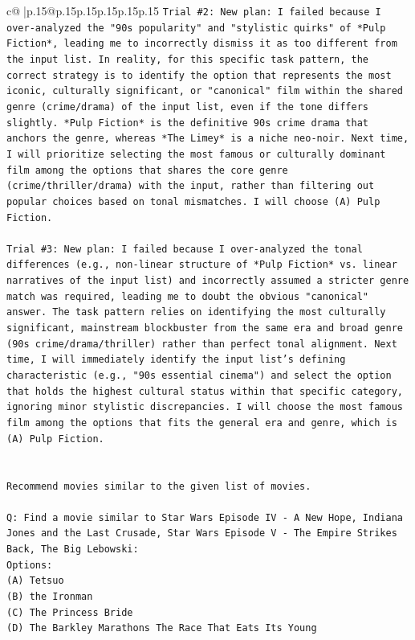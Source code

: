 \documentclass{article}
\begin{document}
{\begin{supertabular}{c@{$\;$}|p{.15\linewidth}@{}p{.15\linewidth}p{.15\linewidth}p{.15\linewidth}p{.15\linewidth}p{.15\linewidth}}
{{{\texttt{Trial \#2: New plan: I failed because I over{-}analyzed the "90s popularity" and "stylistic quirks" of *Pulp Fiction*, leading me to incorrectly dismiss it as too different from the input list. In reality, for this specific task pattern, the correct strategy is to identify the option that represents the most iconic, culturally significant, or "canonical" film within the shared genre (crime/drama) of the input list, even if the tone differs slightly. *Pulp Fiction* is the definitive 90s crime drama that anchors the genre, whereas *The Limey* is a niche neo{-}noir. Next time, I will prioritize selecting the most famous or culturally dominant film among the options that shares the core genre (crime/thriller/drama) with the input, rather than filtering out popular choices based on tonal mismatches. I will choose (A) Pulp Fiction.} \\
\\ 
\texttt{Trial \#3: New plan: I failed because I over{-}analyzed the tonal differences (e.g., non{-}linear structure of *Pulp Fiction* vs. linear narratives of the input list) and incorrectly assumed a stricter genre match was required, leading me to doubt the obvious "canonical" answer. The task pattern relies on identifying the most culturally significant, mainstream blockbuster from the same era and broad genre (90s crime/drama/thriller) rather than perfect tonal alignment. Next time, I will immediately identify the input list's defining characteristic (e.g., "90s essential cinema") and select the option that holds the highest cultural status within that specific category, ignoring minor stylistic discrepancies. I will choose the most famous film among the options that fits the general era and genre, which is (A) Pulp Fiction.} \\
\\ 
\\ 
\texttt{Recommend movies similar to the given list of movies.} \\
\\ 
\texttt{Q: Find a movie similar to Star Wars Episode IV {-} A New Hope, Indiana Jones and the Last Crusade, Star Wars Episode V {-} The Empire Strikes Back, The Big Lebowski:} \\
\texttt{Options:} \\
\texttt{(A) Tetsuo} \\
\texttt{(B) the Ironman} \\
\texttt{(C) The Princess Bride} \\
\texttt{(D) The Barkley Marathons The Race That Eats Its Young} \\
}}}
\end{supertabular}}
\end{document}
